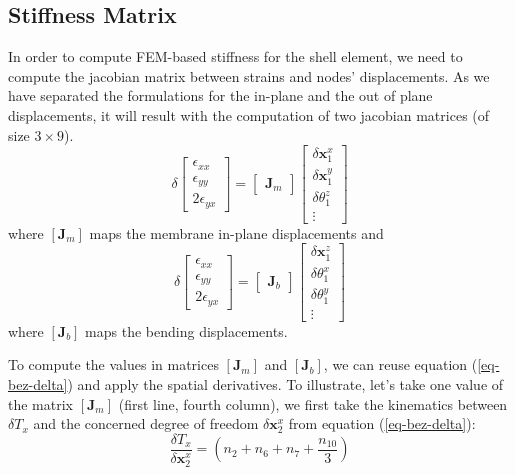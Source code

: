 \documentclass{egpubl}
\newcommand{\mat}[1]{\mathbf{#1}}
\begin{document}

\subsection{Stiffness Matrix} %

In order to compute FEM-based stiffness for the shell element, we need to compute the jacobian matrix between strains and nodes' displacements.
As we have separated the formulations for the in-plane and the out of plane displacements, it will result with the computation of two jacobian matrices (of size $3\times9$).
\begin{equation}
    \delta 
    \begin{bmatrix}
        \epsilon_{xx} \\ \epsilon_{yy}  \\ 2\epsilon_{yx}
    \end{bmatrix}
    = \begin{bmatrix} \mat{J}_m \end{bmatrix}
    \begin{bmatrix}
        \delta \mat{x}_1^x \\ \delta \mat{x}_1^y \\ \delta \theta_1^z \\ \vdots
    \end{bmatrix}
\end{equation}
where $\left[ \mat{J}_m \right]$ maps the membrane in-plane displacements and 
%
\begin{equation}
    \delta
    \begin{bmatrix}
        \epsilon_{xx} \\ \epsilon_{yy}  \\ 2\epsilon_{yx}
    \end{bmatrix}
    = \begin{bmatrix} \mat{J}_b \end{bmatrix}
    \begin{bmatrix}
        \delta \mat{x}_1^z \\ \delta \theta_1^x \\ \delta \theta_1^y \\ \vdots
    \end{bmatrix}
\end{equation}
where $\left[ \mat{J}_b \right]$ maps the bending displacements.

To compute the values in matrices $\left[ \mat{J}_m \right]$ and $\left[ \mat{J}_b \right]$,  we can reuse equation (\ref{eq-bez-delta}) and apply the spatial derivatives.
To illustrate, let's take one value of the matrix $\left[ \mat{J}_m \right]$  (first line, fourth column), we first take the kinematics between $\delta T_x$ and the concerned degree of freedom $ \delta \mathbf{x}_2^x$ from equation (\ref{eq-bez-delta}):
\begin{equation}
    \frac{ \delta T_x }{ \delta \mathbf{x}_2^x } = (n_2 + n_6 + n_7 + \frac{n_{10}}{3})
\end{equation}
\end{document}
